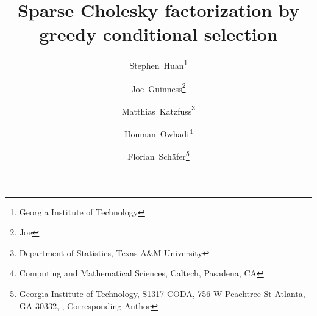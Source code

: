 \makeatletter
\newcommand*{\subalign}[1]{%
  \vcenter{%
    \Let@ \restore@math@cr \default@tag
    \baselineskip\fontdimen10 \scriptfont\tw@
    \advance\baselineskip\fontdimen12 \scriptfont\tw@
    \lineskip\thr@@\fontdimen8 \scriptfont\thr@@
    \lineskiplimit\lineskip
    \ialign{\hfil$\m@th\scriptstyle##$&$\m@th\scriptstyle{}##$\hfil\crcr
      #1\crcr
    }%
  }%
}
\makeatother

\renewcommand*{\algorithmicrequire}{\textbf{Input:}}
\renewcommand*{\algorithmicensure}{\textbf{Output:}}

\newcommand*{\creflastconjunction}{, and~}



\title{Sparse Cholesky factorization by greedy conditional selection}

\author{
  Stephen\ Huan\thanks{Georgia Institute of Technology} \and
  Joe\ Guinness\thanks{Joe} \and
  Matthias\ Katzfuss\thanks{Department of Statistics, Texas A\&M University} \and
  Houman\ Owhadi\thanks{Computing and Mathematical Sciences, Caltech, Pasadena, CA  } \and
  Florian\ Sch{\"a}fer\thanks{Georgia Institute of Technology,
  S1317 CODA, 756 W Peachtree St Atlanta, GA 30332, \newline
  , Corresponding Author}
}

\newcommand*{\defeq}{\coloneqq}
\newcommand*{\BigO}{\mathcal{O}}
\newcommand*{\N}{\mathcal{N}}
\newcommand*{\SpSet}{\mathcal{S}}
\newcommand*{\GP}{\mathcal{GP}}
\newcommand*{\Loss}{\mathcal{L}}
\newcommand*{\Order}{\mathcal{I}}
\newcommand*{\Reverse}{\updownarrow}
\newcommand*{\I}{I}
\newcommand*{\J}{J}
\newcommand*{\V}{V}

\renewcommand*{\vec}[1]{\bm{#1}}
\newcommand*{\Id}{\text{Id}}

\newcommand*{\CM}{\Theta}
\newcommand*{\mean}{\mu}
\newcommand*{\var}{\sigma^2}
\newcommand*{\std}{\sigma}
\newcommand*{\K}{K}
\newcommand*{\Train}{\text{Tr}}
\newcommand*{\Pred}{\text{Pr}}

